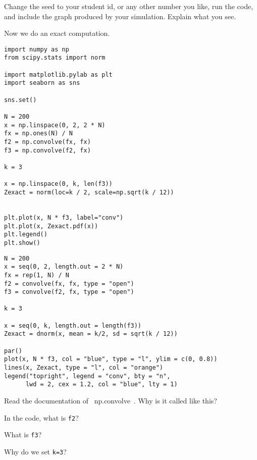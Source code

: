 \begin{exercise}
Change the seed to your student id, or any other number you like, run the code, and include the graph produced by your simulation.
Explain what you see.
\end{exercise}


Now we do an exact computation.

\begin{verbatim}
import numpy as np
from scipy.stats import norm

import matplotlib.pylab as plt
import seaborn as sns

sns.set()

N = 200
x = np.linspace(0, 2, 2 * N)
fx = np.ones(N) / N
f2 = np.convolve(fx, fx)
f3 = np.convolve(f2, fx)

k = 3

x = np.linspace(0, k, len(f3))
Zexact = norm(loc=k / 2, scale=np.sqrt(k / 12))


plt.plot(x, N * f3, label="conv")
plt.plot(x, Zexact.pdf(x))
plt.legend()
plt.show()
\end{verbatim}

\begin{verbatim}
N = 200
x = seq(0, 2, length.out = 2 * N)
fx = rep(1, N) / N
f2 = convolve(fx, fx, type = "open")
f3 = convolve(f2, fx, type = "open")

k = 3

x = seq(0, k, length.out = length(f3))
Zexact = dnorm(x, mean = k/2, sd = sqrt(k / 12))

par()
plot(x, N * f3, col = "blue", type = "l", ylim = c(0, 0.8))
lines(x, Zexact, type = "l", col = "orange")
legend("topright", legend = "conv", bty = "n",
      lwd = 2, cex = 1.2, col = "blue", lty = 1)
\end{verbatim}

\begin{exercise}
Read the documentation of ~np.convolve~. Why is it called like this?
\end{exercise}

\begin{exercise}
In the code, what is \texttt{f2}?
\end{exercise}

\begin{exercise}
What is \texttt{f3}?
\end{exercise}

\begin{exercise}
Why do we set \texttt{k=3}?
\end{exercise}

